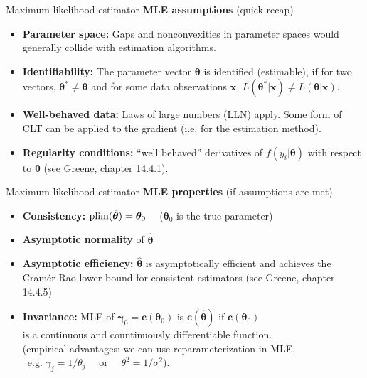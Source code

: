 \documentclass{beamer}
\begin{document}
\begin{frame}{Maximum likelihood estimator}
\textbf{MLE assumptions} (quick recap)\\ \medskip
\begin{itemize}
    \item \textbf{Parameter space:} Gaps and nonconvexities in parameter spaces would generally collide with estimation algorithms.
    \item \textbf{Identifiability:} The parameter vector $\bm{\theta}$ is identified (estimable), if for two vectors, $\bm{\theta}^{*} \neq \bm{\theta}$ and for some data observations $\bm{x}$, $L(\bm{\theta}^{*}|\bm{x}) \neq L(\bm{\theta}|\bm{x})$.
    \item \textbf{Well-behaved data:} Laws of large numbers (LLN) apply. Some form of CLT can be applied to the gradient (i.e. for the estimation method).
    \item \textbf{Regularity conditions:} ``well behaved'' derivatives of $f(y_i|\bm{\theta})$ with respect to $\bm{\theta}$ (see Greene, chapter 14.4.1).
\end{itemize}
\end{frame}
\begin{frame}{Maximum likelihood estimator}
\textbf{MLE properties} (if assumptions are met)\\ \medskip
\begin{itemize}
    \item \textbf{Consistency:} $\textnormal{plim}(\hat{\bm{\theta}}) = \bm{\theta}_0$ ~~($\bm{\theta}_0$ is the true parameter)
    \medskip
    \item \textbf{Asymptotic normality} of $\bm{\hat{\theta}}$
    \medskip
    \item \textbf{Asymptotic efficiency:}  $\bm{\hat{\theta}}$ is asymptotically efficient and achieves the Cramér-Rao lower bound for consistent estimators (see Greene, chapter 14.4.5)
    \medskip
    \item \textbf{Invariance:} MLE of $\bm{\gamma}_0=\bm{c}(\bm{\theta}_0)$ is $\bm{c}(\bm{\hat{\theta}})$ if $\bm{c}(\bm{\theta}_0)$ \\is a continuous and countinuously differentiable function.\\ \smallskip \footnotesize{ 
    (empirical advantages: we can use reparameterization in MLE, \\~e.g. $\gamma_j = 1/\theta_j$ ~~or~~ $\theta^2 = 1/\sigma^2$).}
\end{itemize}
\end{frame}
\end{document}
